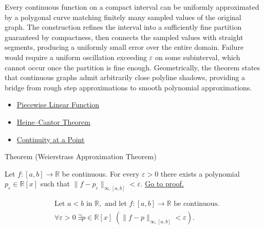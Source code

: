 \begin{remark*}[Interpretation]
Every continuous function on a compact interval can be uniformly approximated by a polygonal curve matching finitely many sampled values of the original graph. The construction refines the interval into a sufficiently fine partition guaranteed by compactness, then connects the sampled values with straight segments, producing a uniformly small error over the entire domain. Failure would require a uniform oscillation exceeding $\varepsilon$ on some subinterval, which cannot occur once the partition is fine enough. Geometrically, the theorem states that continuous graphs admit arbitrarily close polyline shadows, providing a bridge from rough step approximations to smooth polynomial approximations.
\end{remark*}

\begin{dependencies}
\begin{itemize}
  \item \hyperref[def:piecewise-linear-function]{Piecewise Linear Function}
  \item \hyperref[thm:heine-cantor]{Heine--Cantor Theorem}
  \item \hyperref[def:continuous-at-point]{Continuity at a Point}
\end{itemize}
\end{dependencies}

\begin{theorembox}{Theorem (Weierstrass Approximation Theorem)}
\begin{theorem}
\label{thm:weierstrass-approximation}
Let $f:[a,b]\to\mathbb{R}$ be continuous. For every $\varepsilon>0$ there exists a polynomial $p_\varepsilon\in\mathbb{R}[x]$ such that $\|f-p_\varepsilon\|_{\infty,[a,b]}<\varepsilon$.
\hyperref[prf:weierstrass-approximation]{Go to proof.}
\end{theorem}
\end{theorembox}

\begin{remark*}
\[
\begin{aligned}
&\text{Let } a<b \text{ in } \mathbb{R}, \text{ and let } f:[a,b]\to\mathbb{R} \text{ be continuous}.\\
&\forall \varepsilon>0\;\exists p\in\mathbb{R}[x]\;(\|f-p\|_{\infty,[a,b]}<\varepsilon).
\end{aligned}
\]
\end{remark*}

